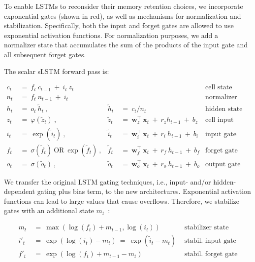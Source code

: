 To enable LSTMs to reconsider their memory retention choices, we incorporate exponential gates (shown in red), as well as mechanisms for normalization and stabilization. Specifically, both the input and forget gates are allowed to use exponential activation functions. For normalization purposes, we add a normalizer state that accumulates the sum of the products of the input gate and all subsequent forget gates.

The scalar sLSTM forward pass is:

\begin{align}
\label{eq:slstmforward}
c_t \ &= \  f_t \ c_{t-1} \ + \ i_t \ z_t & & 
 &\text{cell state} \\
n_t \ &= \  f_t \ n_{t-1} \ + \ i_t  & & 
 &\text{normalizer state} \\
h_t \ &= \ o_t \ \tilde{h}_t \ ,
  &\tilde{h}_t \ &= \ c_t / n_t
&\text{hidden state} \\
z_t \ &= \ \varphi \left( \tilde{z}_t \right) \ , 
  &\tilde{z}_t \ &=  \ \mathbf{w}^\top_{z} \ \mathbf{x}_t \ + \
  r_{z}  h_{t-1} \ + \  b_{z}
  &\text{cell input} \\
i_t \ &= \ \!\exp \left( \tilde{i}_t  \right) \ , 
  &\tilde{i}_t \ &= \ \mathbf{w}^\top_{i} \ \mathbf{x}_t \ + \
  r_{i}  \ h_{t-1} \ + \  b_{i}
  &\text{input gate} \\
f_t \ &= \ \sigma \left(  \tilde{f}_t \right) \ \text{OR} \
\!\exp \left(  \tilde{f}_t \right) \ ,
  &\tilde{f}_t \ &= \ \mathbf{w}^\top_{f} \ \mathbf{x}_t  \ + \
  r_{f}  \ h_{t-1} \ + \  b_{f}
  &\text{forget gate} \\
o_t \ &= \ \sigma \left( \tilde{o}_t \right) \ , 
  &\tilde{o}_t  \ &= \ \mathbf{w}^\top_{o} \ \mathbf{x}_t \ + \
  r_{o}  \ h_{t-1} \ + \  b_{o}
  &\text{output gate} 
\end{align}

We transfer the original LSTM gating techniques, i.e., input- and/or hidden-dependent gating plus bias term, to the new architectures. Exponential activation functions can lead to large values that cause overflows. Therefore, we stabilize gates with an additional state \mbox{$m_t$~\citep{Milakov:18arxiv}}:

\begin{align}
\label{eq:slstmstabil}
m_t \ &= \ \max \left( \log ( f_t ) + m_{t-1} , \log ( i_t ) \right) &\text{stabilizer state} \\
i'_t \ &= \ \!\exp \left( \log \left ( i_t \right) - m_t \right) \ = \ \!\exp \left( \tilde{i}_t - m_t \right) \ \, 
  &\text{stabil. input gate} \\
f'_t \ &= \ \!\exp \left( \log \left( f_t \right) + m_{t-1} - m_t \right) \ \, 
  &\text{stabil. forget gate}
\end{align}

